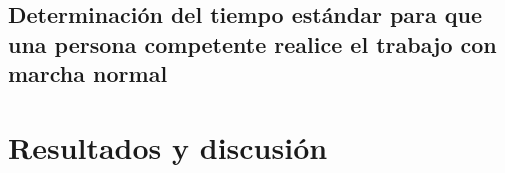%
%
\subsection{Determinación del tiempo estándar para que una persona competente realice el trabajo con marcha normal}

%
%



% 
% 

\section{Resultados y discusión}

